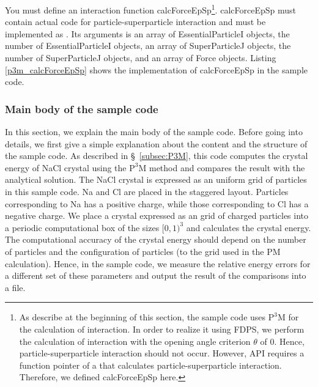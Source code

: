  \label{subsubsubsec:p3m_calcForceEpSp}
You must define an interaction function \textsf{calcForceEpSp}\footnote{As describe at the beginning of this section, the sample code uses $\mathrm{P^{3}M}$ for the calculation of interaction. In order to realize it using FDPS, we perform the calculation of interaction with the opening angle criterion $\theta$ of 0. Hence, particle-superparticle interaction should not occur. However, API  requires a function pointer of a \procedure that calculates particle-superparticle interaction. Therefore, we defined \textsf{calcForceEpSp} here.}. \textsf{calcForceEpSp} must contain actual code for particle-superparticle interaction and must be implemented as \procedure {}. Its arguments is an array of \textsf{EssentialParticleI} objects, the number of \textsf{EssentialParticleI} objects, an array of \textsf{SuperParticleJ} objects, the number of \textsf{SuperParticleJ} objects, and an array of \textsf{Force} objects. Listing \ref{p3m_calcForceEpSp} shows the implementation of \textsf{calcForceEpSp} in the sample code.

\ifCpp

\endifCpp
\ifFtn

\endifFtn
\ifC

\endifC


\subsubsection{Main body of the sample code}
In this section, we explain the main body of the sample code. Before going into details, we first give a simple explanation about the content and the structure of the sample code. As described in \S~\ref{subsec:P3M}, this code computes the crystal energy of NaCl crystal using the $\mathrm{P^{3}M}$ method and compares the result with the analytical solution. The NaCl crystal is expressed as an uniform grid of particles in this sample code. Na and Cl are placed in the staggered layout. Particles corresponding to Na has a positive charge, while those corresponding to Cl has a negative charge. We place a crystal expressed as an grid of charged particles into a periodic computational box of the sizes $[0,1)^{3}$ and calculates the crystal energy. The computational accuracy of the crystal energy should depend on the number of particles and the configuration of particles (to the grid used in the PM calculation). Hence, in the sample code, we measure the relative energy errors for a different set of these parameters and output the result of the comparisons into a file.

